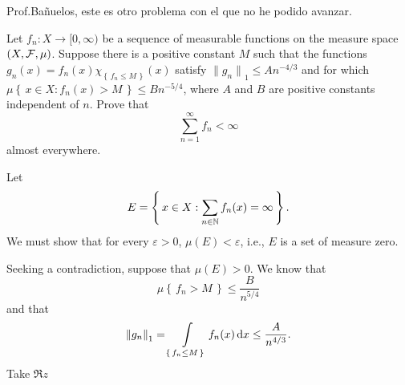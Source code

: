\documentclass[12pt,twoside]{article}
\renewcommand*{\thefootnote}{\fnsymbol{footnote}}
\begin{document}
\renewcommand*{\thefootnote}{\fnsymbol{footnote}}

\thispagestyle{empty}
\author{\href{mailto:\email}{\auth}}
\title{\tight}
\date{\today}
\maketitle

Prof.\@ Bañuelos, este es otro problema con el que no he podido avanzar.
\begin{problem}
  Let $f_n\colon X\to[0,\infty)$ be a sequence of measurable functions on
  the measure space $(X,\mathcal{F},\mu)$. Suppose there is a positive constant
  $M$ such that the functions
  $g_n(x)=f_n (x)\chi_{\left\{\,f_n\leq M\,\right\}}(x)$ satisfy
  ${\|g_n\|}_1\leq An^{-4/3}$ and for which
  $\mu\left\{\,x\in X:f_n(x)>M\,\right\}\leq Bn^{-5/4}$, where $A$ and $B$
  are positive constants independent of $n$. Prove that
  \[
    \sum_{n=1}^\infty f_n<\infty
  \]
  almost everywhere.
\end{problem}
\begin{solution}
  Let
  \[
    E=\left\{\,x\in X:\sum_{n\in\mathbb{N}} f_n(x)=\infty\,\right\}.
  \]
  We must show that for every $\varepsilon>0$, $\mu(E)<\varepsilon$, i.e.,
  $E$ is a set of measure zero.

  Seeking a contradiction, suppose that $\mu(E)>0$. We know that
  \[
    \mu\left\{\,f_n>M\,\right\}\leq\frac{B}{n^{5/4}}
  \]
  and that
  \[
    {\|g_n\|}_1=\int\limits_{\left\{\,f_n\leq M\,\right\}}
    f_n(x)\mathop{}\!\mathrm{d} x\leq\frac{A}{n^{4/3}}.
  \]
  Take $\Re z$
\end{solution}
\end{document}
